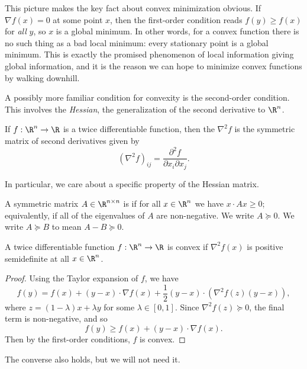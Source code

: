 \documentclass[a4paper]{scrartcl}
\begin{document}
This picture makes the key fact about convex minimization obvious. If $\nabla f(x) = 0$ at some point $x$, then the first-order condition reads $f(y) \geq f(x)$ for \emph{all} $y$, so $x$ is a global minimum. In other words, for a convex function there is no such thing as a bad local minimum: every stationary point is a global minimum. This is exactly the promised phenomenon of local information giving global information, and it is the reason we can hope to minimize convex functions by walking downhill.

A possibly more familiar condition for convexity is the second-order condition. This involves the \emph{Hessian}, the generalization of the second derivative to $\R^n$.

\begin{definition}[Hessian]
    If $f: \R^n \rightarrow \R$ is a twice differentiable function, then the  $\nabla^2 f$ is the symmetric matrix of second derivatives given by
    $$
    (\nabla^2 f)_{ij} = \frac{\partial^2 f}{\partial x_i \partial x_j}.
    $$
\end{definition}

In particular, we care about a specific property of the Hessian matrix.

\begin{definition}
    A symmetric matrix $A \in \R^{n \times n}$ is  if for all $x \in \R^n$ we have $x \cdot Ax \geq 0$; equivalently, if all of the eigenvalues of $A$ are non-negative. We write $A \succeq 0$. We write $A \succeq B$ to mean $A - B \succeq 0$.
\end{definition}

\begin{proposition}
A twice differentiable function $f:\R^n \rightarrow \R$ is convex if $\nabla^2 f(x)$ is positive semidefinite at all $x \in \R^n$.
\end{proposition}
\begin{proof}
    Using the Taylor expansion of $f$, we have
    $$
f(y) = f(x) + (y - x) \cdot \nabla f(x) + \frac{1}{2}(y - x) \cdot ( \nabla^2f(z)(y - x)),
    $$
    where $z = (1 - \lambda)x + \lambda y$ for some $\lambda \in [0, 1]$. Since $\nabla^2 f(z) \succeq 0$, the final term is non-negative, and so
    $$
    f(y) \geq f(x) + (y-x) \cdot \nabla f(x).
    $$
    Then by the first-order conditions, $f$ is convex.
\end{proof}

The converse also holds, but we will not need it.
\end{document}
